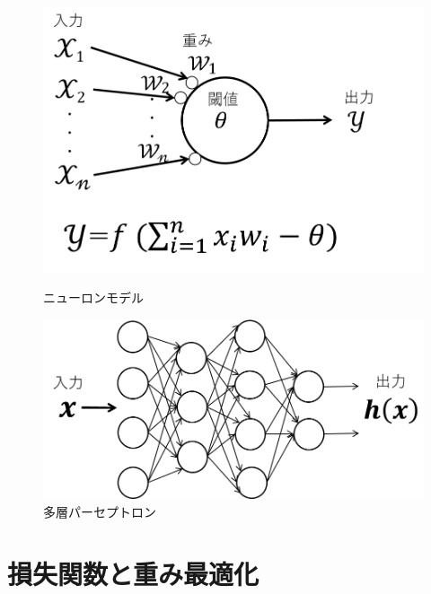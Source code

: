 \documentclass[a4j, 11pt]{jreport}
\begin{document}
\begin{figure}[htbp]
	\begin{minipage}{0.5\hsize}
		\begin{center}
			\includegraphics[scale=0.5]{./images/deeplearning/neuron_model.png}
			\caption{ニューロンモデル \label{fig:neuron}}
			
		\end{center}
	\end{minipage}
	\begin{minipage}{0.5\hsize}
		\begin{center}
			\includegraphics[scale=0.5]{./images/deeplearning/tasou.png}
			\caption{多層パーセプトロン \label{fig:tasou}}
			
		\end{center}
	\end{minipage}
\end{figure}

\section{損失関数と重み最適化}
\end{document}
